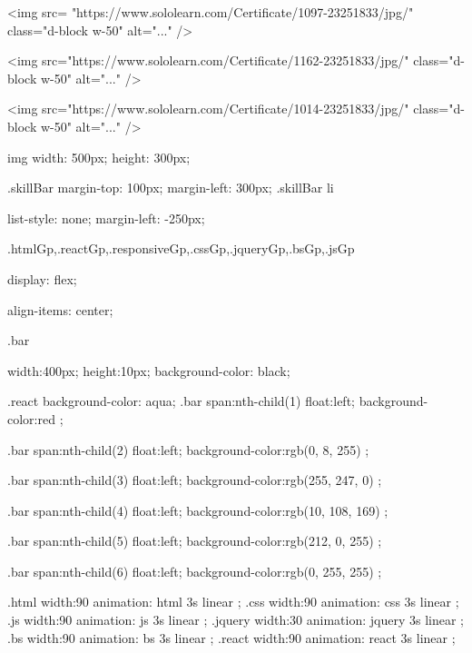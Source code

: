 <img src= "https://www.sololearn.com/Certificate/1097-23251833/jpg/"         class="d-block w-50" alt="..."  />




 <img src="https://www.sololearn.com/Certificate/1162-23251833/jpg/"     class="d-block w-50" alt="..."  />

 <img src="https://www.sololearn.com/Certificate/1014-23251833/jpg/"      class="d-block w-50" alt="..."  />



























img{
    width: 500px;
    height: 300px;
}

.skillBar{
    margin-top: 100px;
    margin-left: 300px;
}
.skillBar li{
    list-style: none;
    margin-left: -250px;
 
}
.htmlGp,.reactGp,.responsiveGp,.cssGp,.jqueryGp,.bsGp,.jsGp{
    display: flex;
    
    align-items: center;
}

.bar{
    width:400px;
    height:10px;
    background-color: black;
    

}

.react{
    background-color: aqua;
}
.bar span:nth-child(1){
    float:left;
    background-color:red ;
}

.bar span:nth-child(2){
    float:left;
    background-color:rgb(0, 8, 255) ;
}

.bar span:nth-child(3){
    float:left;
    background-color:rgb(255, 247, 0) ;
}

.bar span:nth-child(4){
    float:left;
    background-color:rgb(10, 108, 169) ;
}

.bar span:nth-child(5){
    float:left;
    background-color:rgb(212, 0, 255) ;
}

.bar span:nth-child(6){
    float:left;
    background-color:rgb(0, 255, 255) ;
}



.html{
    width:90%
    animation: html 3s linear ;
}
.css{
    width:90%
    animation: css 3s linear ;
}
.js{
    width:90%
    animation: js 3s linear ;
}
.jquery{
    width:30%
    animation: jquery 3s linear ;
}
.bs{
    width:90%
    animation: bs 3s linear ;
}
.react{
    width:90%
    animation: react 3s linear ;
}










